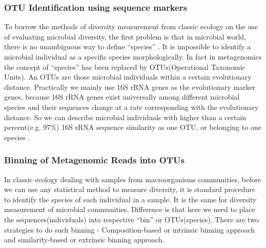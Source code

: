 \subsubsection{OTU Identification using sequence markers} To borrow the methods
of diversity measurement from classic ecology on the use of evaluating
microbial diversity, the first problem is that in microbial world, there is no
unambiguous way to define ``species'' \cite{Stackebrandt:2002aa}. It is
impossible to identify a microbial individual as a specific species
morphologically. In fact in metagenomics the concept of ``species'' has been
replaced by OTUs(Operational Taxonomic Units). An OTUs are those microbial
individuals within a certain evolutionary distance. Practically we mainly use
16S rRNA genes as the evolutionary marker genes, because 16S rRNA genes exist
universally among different microbial species and their sequences change at a
rate corresponding with the evolutionary distance. So we can describe microbial
individuals with higher than a certain percent(e.g. 97\%) 16S rRNA sequence
similarity as one OTU, or belonging to one species \cite{Schloss:2005aa}.

\subsubsection{Binning of Metagenomic Reads into OTUs}

In classic ecology dealing with samples from macroorganisms communities, before
we can use any statistical method to measure diversity, it is standard
procedure to identify the species of each individual in a sample. It is the
same for diversity measurement of microbial communities. Difference is that
here we need to place the sequences(individuals) into respective ``bin'' or
OTUs(species). There are two strategies to do such binning - Composition-based
or intrinsic binning approach and similarity-based or extrinsic binning
approach.

